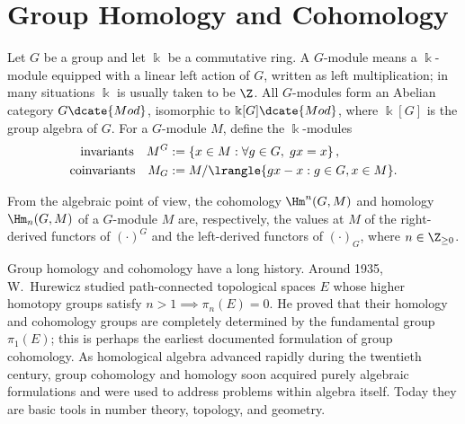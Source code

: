 
\chapter{Group Homology and Cohomology}\label{sec:group-coh}
\hypertarget{o014.aljabr2.chapter6.overview-g-modules-resolutions}{ }

Let $G$ be a group and let $\Bbbk$ be a commutative ring. A $G$-module means
a $\Bbbk$-module equipped with a linear left action of $G$, written as left
multiplication; in many situations $\Bbbk$ is usually taken to be $\Z$. All
$G$-modules form an Abelian category $G\dcate{Mod}$, isomorphic to
$\Bbbk[G]\dcate{Mod}$, where $\Bbbk[G]$ is the group algebra of $G$. For a
$G$-module $M$, define the $\Bbbk$-modules
\begin{align*}
	\text{invariants} \quad M^G & := \left\{x \in M: \forall g \in G, \; gx=x \right\}, \\
	\text{coinvariants} \quad M_G & := M / \lrangle{gx-x: g \in G, x \in M}.
\end{align*}

From the algebraic point of view, the cohomology $\Hm^n(G,M)$ and homology
$\Hm_n(G,M)$ of a $G$-module $M$ are, respectively, the values at $M$ of the
right-derived functors of $(\cdot)^G$ and the left-derived functors of
$(\cdot)_G$, where $n\in\Z_{\geq0}$.

Group homology and cohomology have a long history. Around 1935, W.\ Hurewicz
studied path-connected topological spaces $E$ whose higher homotopy groups
satisfy $n>1\implies\pi_n(E)=0$. He proved that their homology and cohomology
groups are completely determined by the fundamental group $\pi_1(E)$; this is
perhaps the earliest documented formulation of group cohomology. As
homological algebra advanced rapidly during the twentieth century, group
cohomology and homology soon acquired purely algebraic formulations and were
used to address problems within algebra itself. Today they are basic tools in
number theory, topology, and geometry.

